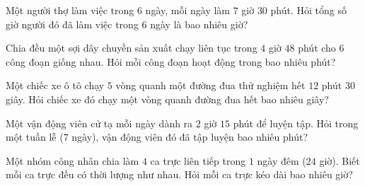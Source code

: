 \begin{ex} %
Một người thợ làm việc trong $6$ ngày, mỗi ngày làm $7$ giờ $30$ phút. Hỏi tổng số giờ người đó đã làm việc trong $6$ ngày là bao nhiêu giờ?
\end{ex}

\begin{ex} %
Chia đều một sợi dây chuyền sản xuất chạy liên tục trong $4$ giờ $48$ phút cho $6$ công đoạn giống nhau. Hỏi mỗi công đoạn hoạt động trong bao nhiêu phút?
\end{ex}

\begin{ex} %
Một chiếc xe ô tô chạy $5$ vòng quanh một đường đua thử nghiệm hết $12$ phút $30$ giây. Hỏi chiếc xe đó chạy một vòng quanh đường đua hết bao nhiêu giây?
\end{ex}

\begin{ex} %
Một vận động viên cử tạ mỗi ngày dành ra $2$ giờ $15$ phút để luyện tập. Hỏi trong một tuần lễ ($7$ ngày), vận động viên đó đã tập luyện bao nhiêu phút?
\end{ex}

\begin{ex} %
Một nhóm công nhân chia làm $4$ ca trực liên tiếp trong $1$ ngày đêm ($24$ giờ). Biết mỗi ca trực đều có thời lượng như nhau. Hỏi mỗi ca trực kéo dài bao nhiêu giờ?
\end{ex}
